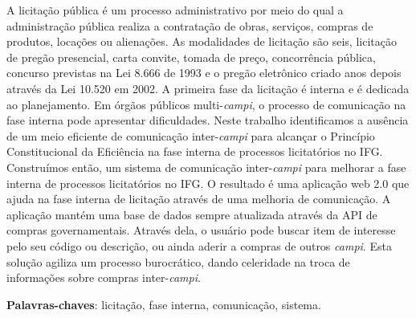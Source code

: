 \begin{resumo}
 A licitação pública é um processo administrativo por meio do qual a administração pública realiza a contratação de obras, serviços, compras de produtos, locações ou alienações.
 As modalidades de licitação são seis, licitação de pregão presencial, carta convite, tomada de preço, concorrência pública, concurso previstas na Lei 8.666 de 1993 e o pregão eletrônico criado anos depois através da Lei 10.520 em 2002.
 A primeira fase da licitação é interna e é dedicada ao planejamento.
 Em órgãos públicos multi-\textit{campi}, o processo de comunicação na fase interna pode apresentar dificuldades.
 Neste trabalho identificamos a ausência de um meio eficiente de comunicação inter-\textit{campi} para alcançar o Princípio Constitucional da Eficiência na fase interna de processos licitatórios no IFG.
 Construímos então, um sistema de comunicação inter-\textit{campi} para melhorar a fase interna de processos licitatórios no IFG.
 O resultado é uma aplicação web 2.0 que ajuda na fase interna de licitação através de uma melhoria de comunicação.
 A aplicação mantém uma base de dados sempre atualizada através da API de compras governamentais.
 Através dela, o usuário pode buscar item de interesse pelo seu código ou descrição, ou ainda aderir a compras de outros \textit{campi}.
 Esta solução agiliza um processo burocrático, dando celeridade na troca de informações sobre compras inter-\textit{campi}.
 \vspace{\onelineskip}
    
 \noindent
 \textbf{Palavras-chaves}: licitação, fase interna, comunicação, sistema.
\end{resumo}
